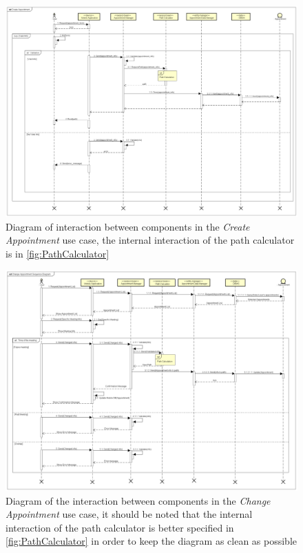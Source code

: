 \begin{figure}
\centering
\includegraphics[width = \textwidth, keepaspectratio = true, angle=90]{Img/CreateAppointmentSQ}
\caption{Diagram of interaction between components in the \emph{Create Appointment} use case, the internal interaction of the path calculator is in \autoref{fig:PathCalculator}}
\label{fig:CreateAppointmentSQ}
\end{figure}

\begin{figure}[h]
\centering
\includegraphics[width = \textwidth, keepaspectratio = true, angle=90]{Img/ChangeAppointmentSequence}
\caption{Diagram of the interaction between components in the \emph{Change Appointment} use case, it should be noted that the internal interaction of the path calculator is better specified in \autoref{fig:PathCalculator} in order to keep the diagram as clean as possible}
\label{fig:ChangeAppointmentSequence}
\end{figure}

